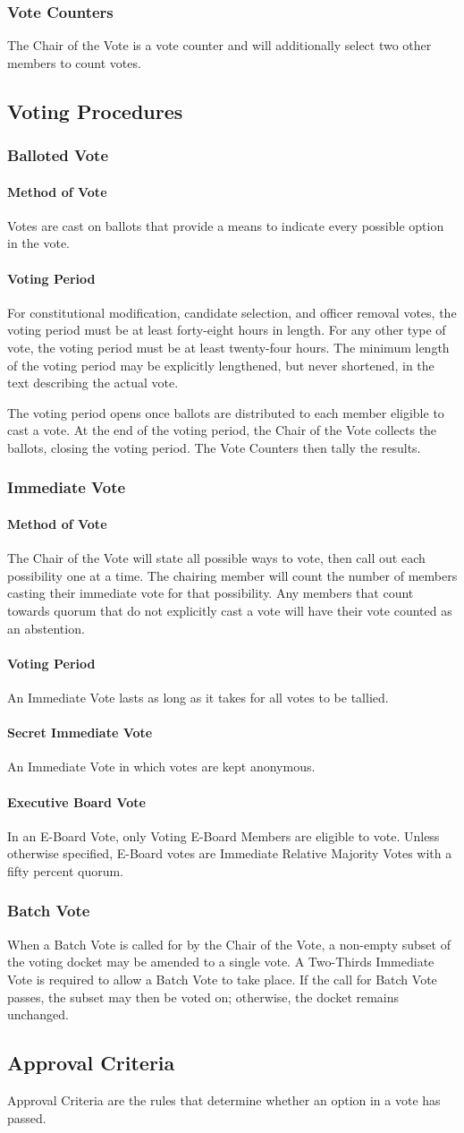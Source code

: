 \documentclass{article}
\newcommand{\asection}[1]{\subsection{#1} \label{#1}}
\newcommand{\asubsection}[1]{\subsubsection{#1} \label{#1}}
\newcommand{\asubsubsection}[1]{\paragraph{#1} \label{#1}}
\begin{document}
\asubsection{Vote Counters}
The Chair of the Vote is a vote counter and will additionally select two other members to count votes.

\asection{Voting Procedures}

\asubsection{Balloted Vote}

\asubsubsection{Method of Vote}
Votes are cast on ballots that provide a means to indicate every possible option in the vote.

\asubsubsection{Voting Period}
For constitutional modification, candidate selection, and officer removal votes, the voting period must be at least forty-eight hours in length.
For any other type of vote, the voting period must be at least twenty-four hours.
The minimum length of the voting period may be explicitly lengthened, but never shortened, in the text describing the actual vote.

The voting period opens once ballots are distributed to each member eligible to cast a vote.
At the end of the voting period, the Chair of the Vote collects the ballots, closing the voting period.
The Vote Counters then tally the results.

\asubsection{Immediate Vote}

\asubsubsection{Method of Vote}
The Chair of the Vote will state all possible ways to vote, then call out each possibility one at a time.
The chairing member will count the number of members casting their immediate vote for that possibility.
Any members that count towards quorum that do not explicitly cast a vote will have their vote counted as an abstention.

\asubsubsection{Voting Period}
An Immediate Vote lasts as long as it takes for all votes to be tallied.

\asubsubsection{Secret Immediate Vote}
An Immediate Vote in which votes are kept anonymous.

\asubsubsection{Executive Board Vote}
In an E-Board Vote, only Voting E-Board Members are eligible to vote.
Unless otherwise specified, E-Board votes are Immediate Relative Majority Votes with a fifty percent quorum.

\asubsection{Batch Vote}
When a Batch Vote is called for by the Chair of the Vote, a non-empty subset of the voting docket may be amended to a single vote.
A Two-Thirds Immediate Vote is required to allow a Batch Vote to take place.
If the call for Batch Vote passes, the subset may then be voted on; otherwise, the docket remains unchanged.

\asection{Approval Criteria}
Approval Criteria are the rules that determine whether an option in a vote has passed.
\end{document}
